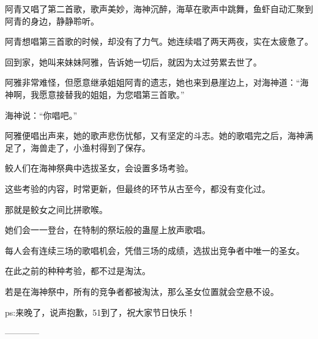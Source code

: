 \begin{this_body}
阿青又唱了第二首歌，歌声美妙，海神沉醉，海草在歌声中跳舞，鱼虾自动汇聚到阿青的身边，静静聆听。

阿青想唱第三首歌的时候，却没有了力气。她连续唱了两天两夜，实在太疲惫了。

回到家，她叫来妹妹阿雅，告诉她一切后，就因为太过劳累去世了。

阿雅非常难怪，但愿意继承姐姐阿青的遗志，她也来到悬崖边上，对海神道：“海神啊，我愿意接替我的姐姐，为您唱第三首歌。”

海神说：“你唱吧。”

阿雅便唱出声来，她的歌声悲伤忧郁，又有坚定的斗志。她的歌唱完之后，海神满足了，海兽走了，小渔村得到了保存。

鲛人们在海神祭典中选拔圣女，会设置多场考验。

这些考验的内容，时常更新，但最终的环节从古至今，都没有变化过。

那就是鲛女之间比拼歌喉。

她们会一一登台，在特制的祭坛般的蛊屋上放声歌唱。

每人会有连续三场的歌唱机会，凭借三场的成绩，选拔出竞争者中唯一的圣女。

在此之前的种种考验，都不过是淘汰。

若是在海神祭中，所有的竞争者都被淘汰，那么圣女位置就会空悬不设。

ps:来晚了，说声抱歉，51到了，祝大家节日快乐！

------------

\end{this_body}

